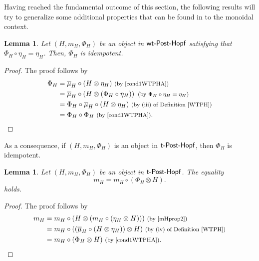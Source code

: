 \documentclass[10pt,a4paper]{amsart}
\numberwithin{equation}{section}
\newtheorem{Lemma}[Theorem]{Lemma}
 { \theoremstyle{definition}
\newtheorem{Definition}[Theorem]{Definition}
\newtheorem{Example}[Theorem]{Example}
\newtheorem{Remark}[Theorem]{Remark} }
\begin{document}
Having reached the fundamental outcome of this section, the following results will try to generalize some additional properties that can be found in \cite{Wang} to the monoidal context.
\begin{Lemma}\label{Phiidemp}
Let $(H,m_{H},\Phi_{H})$ be an object in ${\sf wt}\textnormal{-}\sf{Post}\textnormal{-}\sf{Hopf}$ satisfying that $\Phi_{H}\circ\eta_{H}=\eta_{H}$. Then, $\Phi_{H}$ is idempotent.
\end{Lemma}
\begin{proof}The proof follows by
\begin{align*}
\Phi_{H}={}&\overline{\mu}_{H}\circ(H\otimes\eta_{H})\ \text{\footnotesize\textnormal{(by \eqref{cond1WTPHA})}}\\
={}&\overline{\mu}_{H}\circ\left(H\otimes(\Phi_{H}\circ\eta_{H})\right)\ \text{\footnotesize\textnormal{(by $\Phi_{H}\circ\eta_{H}=\eta_{H}$)}}\\
={}&\Phi_{H}\circ\overline{\mu}_{H}\circ(H\otimes\eta_{H})\ \text{\footnotesize\textnormal{(by (iii) of Definition \ref{WTPH})}}\\
={}&\Phi_{H}\circ\Phi_{H}\ \text{\footnotesize\textnormal{(by \eqref{cond1WTPHA})}}.\tag*{\qed}
\end{align*}
\renewcommand{\qed}{}
\end{proof}

As a consequence, if $(H,m_{H},\Phi_{H})$ is an object in ${\sf t}\textnormal{-}\sf{Post}\textnormal{-}\sf{Hopf}$, then $\Phi_{H}$ is idempotent.
\begin{Lemma}
Let $(H,m_{H},\Phi_{H})$ be an object in ${\sf t}\textnormal{-}\sf{Post}\textnormal{-}\sf{Hopf}$. The equality
\begin{equation}\label{mconPHI}
m_{H}=m_{H}\circ(\Phi_{H}\otimes H).
\end{equation}
holds.
\end{Lemma}
\begin{proof}The proof follows by
\begin{align*}
m_{H}={}&m_{H}\circ(H\otimes(m_{H}\circ(\eta_{H}\otimes H)))\ \text{\footnotesize\textnormal{(by \eqref{mHprop2})}}\\
={}&m_{H}\circ((\overline{\mu}_{H}\circ(H\otimes\eta_{H}))\otimes H)\ \text{\footnotesize\textnormal{(by (iv) of Definition \ref{WTPH})}}\\
={}&m_{H}\circ(\Phi_{H}\otimes H)\ \text{\footnotesize\textnormal{(by \eqref{cond1WTPHA})}}.\tag*{\qed}
\end{align*}
\renewcommand{\qed}{}
\end{proof}
\end{document}
